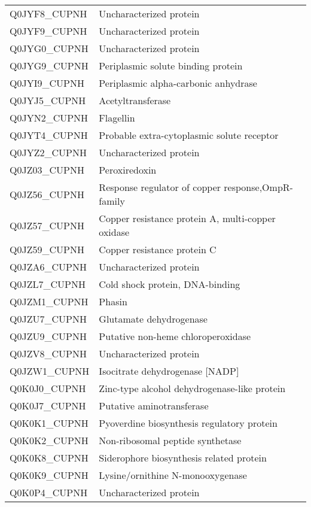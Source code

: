 \begin{center}
\begin{longtable}{ l l }
Q0JYF8\_CUPNH & Uncharacterized protein \\ [0.5ex]
Q0JYF9\_CUPNH & Uncharacterized protein \\ [0.5ex]
Q0JYG0\_CUPNH & Uncharacterized protein \\ [0.5ex]
Q0JYG9\_CUPNH & Periplasmic solute binding protein \\ [0.5ex]
Q0JYI9\_CUPNH & Periplasmic alpha-carbonic anhydrase \\ [0.5ex]
Q0JYJ5\_CUPNH & Acetyltransferase \\ [0.5ex]
Q0JYN2\_CUPNH & Flagellin \\ [0.5ex]
Q0JYT4\_CUPNH & Probable extra-cytoplasmic solute receptor \\ [0.5ex]
Q0JYZ2\_CUPNH & Uncharacterized protein \\ [0.5ex]
Q0JZ03\_CUPNH & Peroxiredoxin \\ [0.5ex]
Q0JZ56\_CUPNH & Response regulator of copper response,OmpR-family \\ [0.5ex]
Q0JZ57\_CUPNH & Copper resistance protein A, multi-copper oxidase \\ [0.5ex]
Q0JZ59\_CUPNH & Copper resistance protein C \\ [0.5ex]
Q0JZA6\_CUPNH & Uncharacterized protein \\ [0.5ex]
Q0JZL7\_CUPNH & Cold shock protein, DNA-binding \\ [0.5ex]
Q0JZM1\_CUPNH & Phasin \\ [0.5ex]
Q0JZU7\_CUPNH & Glutamate dehydrogenase \\ [0.5ex]
Q0JZU9\_CUPNH & Putative non-heme chloroperoxidase \\ [0.5ex]
Q0JZV8\_CUPNH & Uncharacterized protein \\ [0.5ex]
Q0JZW1\_CUPNH & Isocitrate dehydrogenase [NADP] \\ [0.5ex]
Q0K0J0\_CUPNH & Zinc-type alcohol dehydrogenase-like protein \\ [0.5ex]
Q0K0J7\_CUPNH & Putative aminotransferase \\ [0.5ex]
Q0K0K1\_CUPNH & Pyoverdine biosynthesis regulatory protein \\ [0.5ex]
Q0K0K2\_CUPNH & Non-ribosomal peptide synthetase \\ [0.5ex]
Q0K0K8\_CUPNH & Siderophore biosynthesis related protein \\ [0.5ex]
Q0K0K9\_CUPNH & Lysine/ornithine N-monooxygenase \\ [0.5ex]
Q0K0P4\_CUPNH & Uncharacterized protein \\ [0.5ex]

\end{longtable}
\end{center}
